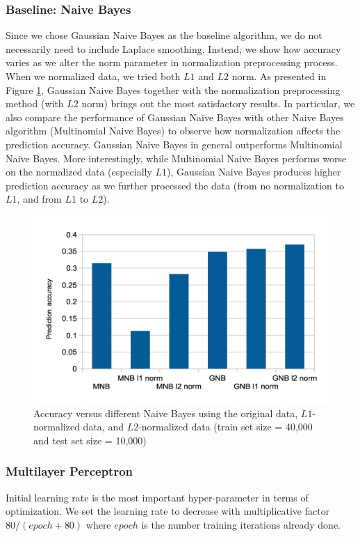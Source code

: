 \documentclass{acm_proc_article-sp}
\begin{document}
\subsubsection{Baseline: Naive Bayes}
Since we chose Gaussian Naive Bayes as the baseline algorithm, we do not necessarily need to include Laplace smoothing. Instead, we show how accuracy varies as we alter the norm parameter in normalization preprocessing process. When we normalized data, we tried both $L1$ and $L2$ norm.  As presented in  Figure \ref{fig:gnbparam}, Gaussian Naive Bayes together with the normalization preprocessing method (with $L2$ norm) brings out the most satisfactory results.   In particular, we also compare the performance of Gaussian Naive Bayes with other Naive Bayes algorithm (Multinomial Naive Bayes) to  observe how normalization affects the prediction accuracy. Gaussian Naive Bayes in general outperforms Multinomial Naive Bayes. More interestingly,  while Multinomial Naive Bayes performs worse on the normalized data (especially $L1$),  Gaussian Naive Bayes produces higher prediction accuracy as we further processed the data (from no normalization to $L1$, and from $L1$ to $L2$).
\begin{figure} 
\centering
\includegraphics[width=1\columnwidth]{graphs/gnb_param.png}  
\caption{Accuracy versus different Naive Bayes using the original data, $L1$-normalized data, and $L2$-normalized data (train set size = 40,000 and test set size = 10,000)}
\label{fig:gnbparam}
\end{figure}


\subsubsection{Multilayer Perceptron}
Initial learning rate is the most important hyper-parameter in terms of optimization. We set the learning rate to decrease with multiplicative factor $80/(epoch+80)$ where $epoch$ is the number training iterations already done. 
\end{document}
